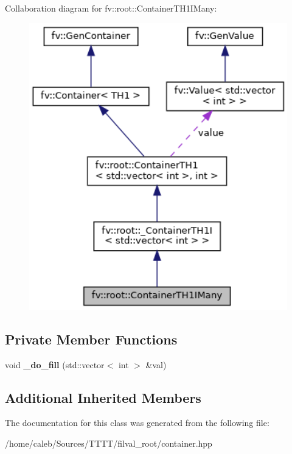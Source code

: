 Collaboration diagram for fv\+:\+:root\+:\+:Container\+T\+H1\+I\+Many\+:
\nopagebreak
\begin{figure}[H]
\begin{center}
\leavevmode
\includegraphics[width=342pt]{classfv_1_1root_1_1ContainerTH1IMany__coll__graph}
\end{center}
\end{figure}
\subsection*{Private Member Functions}
\begin{DoxyCompactItemize}
\item 
\hypertarget{classfv_1_1root_1_1ContainerTH1IMany_af04f55e12ac890d540f64f97852f153b}{}\label{classfv_1_1root_1_1ContainerTH1IMany_af04f55e12ac890d540f64f97852f153b} 
void {\bfseries \+\_\+do\+\_\+fill} (std\+::vector$<$ int $>$ \&val)
\end{DoxyCompactItemize}
\subsection*{Additional Inherited Members}


The documentation for this class was generated from the following file\+:\begin{DoxyCompactItemize}
\item 
/home/caleb/\+Sources/\+T\+T\+T\+T/filval\+\_\+root/container.\+hpp\end{DoxyCompactItemize}
